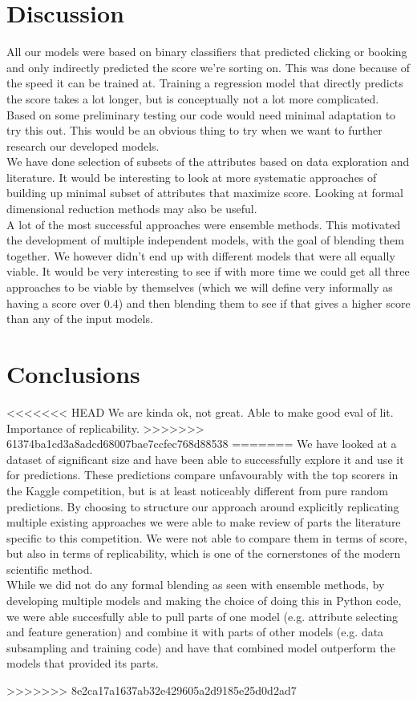 \documentclass{llncs}
\begin{document}
\section{Discussion}
All our models were based on binary classifiers that predicted clicking or booking and only indirectly predicted the score we're sorting on. This was done because of the speed it can be trained at. Training a regression model that directly predicts the score takes a lot longer, but is conceptually not a lot more complicated. Based on some preliminary testing our code would need minimal adaptation to try this out. This would be an obvious thing to try when we want to further research our developed models.\\
We have done selection of subsets of the attributes based on data exploration and literature. It would be interesting to look at more systematic approaches of building up minimal subset of attributes that maximize score. Looking at formal dimensional reduction methods may also be useful.\\
A lot of the most successful approaches were ensemble methods. This motivated the development of multiple independent models, with the goal of blending them together. We however didn't end up with different models that were all equally viable. It would be very interesting to see if with more time we could get all three approaches to be viable by themselves (which we will define very informally as having a score over 0.4) and then blending them to see if that gives a higher score than any of the input models.
\section{Conclusions}
<<<<<<< HEAD
We are kinda ok, not great. Able to make good eval of lit. Importance of replicability.
>>>>>>> 61374ba1cd3a8adcd68007bae7ccfec768d88538
=======
We have looked at a dataset of significant size and have been able to successfully explore it and use it for predictions. These predictions compare unfavourably with the top scorers in the Kaggle competition, but is at least noticeably different from pure random predictions. By choosing to structure our approach around explicitly replicating multiple existing approaches we were able to make review of parts the literature specific to this competition. We were not able to compare them in terms of score, but also in terms of replicability, which is one of the cornerstones of the modern scientific method.\\
While we did not do any formal blending as seen with ensemble methods, by developing multiple models and making the choice of doing this in Python code, we were able succesfully able to pull parts of one model (e.g. attribute selecting and feature generation) and combine it with parts of other models (e.g. data subsampling and training code) and have that combined model outperform the models that provided its parts.

>>>>>>> 8e2ca17a1637ab32e429605a2d9185e25d0d2ad7


\end{document}
